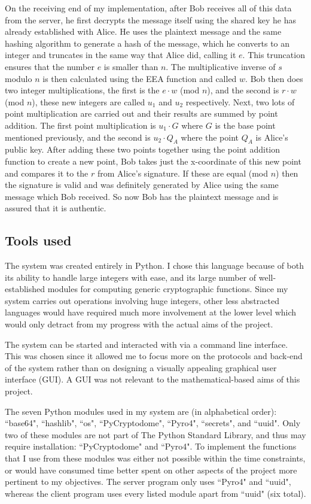 \documentclass[12pt,a4paper]{article}
\begin{document}
On the receiving end of my implementation, after Bob receives all of this data from the server, 
he first decrypts the message itself using the shared key he has already established with Alice. 
He uses the plaintext message and the same hashing algorithm to generate a hash of the message, 
which he converts to an integer and truncates in the same way that Alice did, calling it $e$. 
This truncation ensures that the number $e$ is smaller than $n$. 
The multiplicative inverse of $s$ modulo $n$ is then calculated using the EEA function and called $w$. 
Bob then does two integer multiplications, the first is the $e \cdot w$ (mod $n$), 
and the second is $r \cdot w$ (mod $n$), these new integers are called $u_1$ and $u_2$ respectively. 
Next, two lots of point multiplication are carried out and their results are summed by point addition. 
The first point multiplication is $u_1 \cdot G$ where $G$ is the base point mentioned previously, 
and the second is $u_2 \cdot Q_A$ where the point $Q_A$ is Alice's public key. 
After adding these two points together using the point addition function to create a new point, 
Bob takes just the x-coordinate of this new point and compares it to the $r$ from Alice's signature. 
If these are equal (mod $n$) then the signature is valid and was definitely generated by Alice using the same message which Bob received. 
So now Bob has the plaintext message and is assured that it is authentic. 


\subsection{Tools used} \noindent \label{Tools}
The system was created entirely in Python. 
I chose this language because of both its ability to handle large integers with ease, 
and its large number of well-established modules for computing generic cryptographic functions. 
Since my system carries out operations involving huge integers, other less abstracted languages would 
have required much more involvement at the lower level which would only detract from my progress with the actual aims of the project. 

The system can be started and interacted with via a command line interface. 
This was chosen since it allowed me to focus 
more on the protocols and back-end of the system rather than on designing a visually appealing graphical user interface (GUI). 
A GUI was not relevant to the mathematical-based aims of this project. 

The seven Python modules used in my system are (in alphabetical order): 
``base64", ``hashlib", ``os", ``PyCryptodome", ``Pyro4", ``secrets", and ``uuid". 
Only two of these modules are not part of The Python Standard Library, and thus may require installation: ``PyCryptodome" and ``Pyro4". 
To implement the functions that I use from these modules was either not possible within the time constraints, 
or would have consumed time better spent on other aspects of the project more pertinent to my objectives. 
The server program only uses ``Pyro4" and ``uuid", whereas the client program uses every listed module apart from ``uuid" (six total). 
\end{document}
